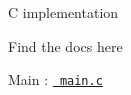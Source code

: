 C implementation

Find the docs here


\begin{DoxyEnumerate}
\item Main \+: \href{./docs/html/index.html}{\texttt{ main.\+c}} 
\end{DoxyEnumerate}